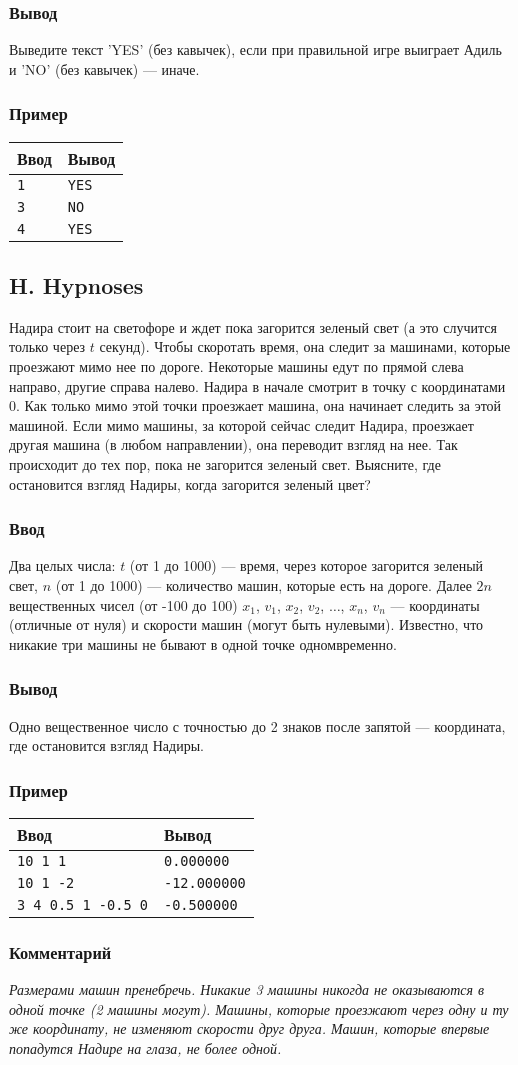 \documentclass[10pt, a4paper]{article}
\newcommand{\informat}[1]
{
	\subsubsection*{Ввод} #1
}
\newcommand{\outformat}[1]
{
	\subsubsection*{Вывод} #1
}
\newcommand{\exampleee}[6]
{
	\subsubsection*{Пример}
	\noindent
	\begin{center}
	\begin{tabularx}{\linewidth}{|X|X|}
	\hline
	Ввод 	& Вывод  	\\
	\hline
	{\tt #1} & {\tt #2}	\\
	\hline
	{\tt #3} & {\tt #4}	\\
	\hline
	{\tt #5} & {\tt #6}	\\
	\hline
	\end{tabularx}
	\end{center}
}
\newcommand{\excomm}[1]
{
	\subsubsection*{Комментарий}
	\textit{#1}
}
\begin{document}
\outformat{Выведите текст 'YES' (без кавычек), если при правильной игре выиграет Адиль и 'NO' (без кавычек) --- иначе.}

\exampleee{1}{YES}{3}{NO}{4}{YES}



\subsection*{H. Hypnoses}

Надира стоит на светофоре и ждет пока загорится зеленый свет (а это случится только через $t$ секунд). Чтобы скоротать время, она следит за машинами, которые проезжают мимо нее по дороге. Некоторые машины едут по прямой слева направо, другие справа налево. Надира в начале смотрит в точку с координатами 0. Как только мимо этой точки проезжает машина, она начинает следить за этой машиной. Если мимо машины, за которой сейчас следит Надира, проезжает другая машина (в любом направлении), она переводит взгляд на нее. Так происходит до тех пор, пока не загорится зеленый свет. Выясните, где остановится взгляд Надиры, когда загорится зеленый цвет?

\informat{Два целых числа: $t$ (от 1 до 1000) --- время, через которое загорится зеленый свет, $n$ (от 1 до 1000) --- количество машин, которые есть на дороге. Далее $2n$ вещественных чисел (от -100 до 100) $x_1$, $v_1$, $x_2$, $v_2$, $\dots$, $x_n$, $v_n$ --- координаты (отличные от нуля) и скорости машин (могут быть нулевыми). Известно, что никакие три машины не бывают в одной точке одномвременно.} 

\outformat{Одно вещественное число с точностью до 2 знаков после запятой --- координата, где остановится взгляд Надиры.}

\exampleee{10 1 \newline 1 1}
{0.000000}
{10 1 \newline 8 -2}
{-12.000000}
{3 4 \newline -2 0.5 \newline -1 1 \newline 1 -0.5 \newline 3 0}
{-0.500000}

\excomm{Размерами машин пренебречь. Никакие 3 машины никогда не оказываются в одной точке (2 машины могут). Машины, которые проезжают через одну и ту же координату, не изменяют скорости друг друга. Машин, которые впервые попадутся Надире на глаза, не более одной.}
\end{document}
